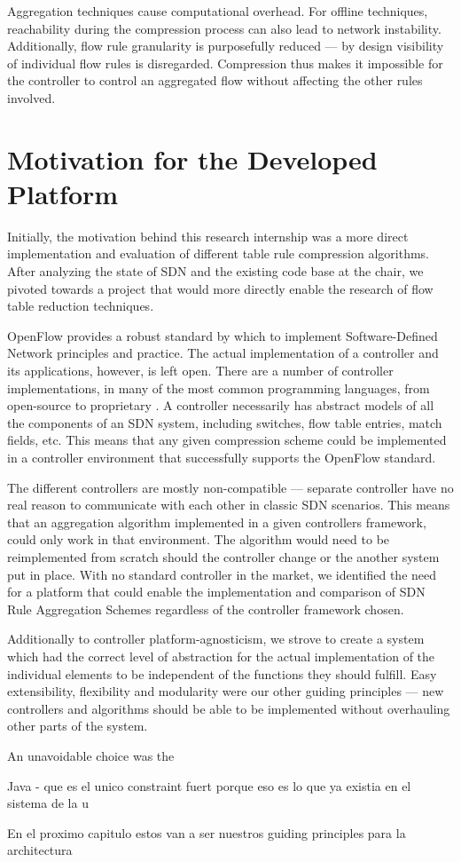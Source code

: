 Aggregation techniques cause computational overhead. For offline techniques, reachability during the compression process can also lead to network instability. Additionally, flow rule granularity is purposefully reduced — by design visibility of individual flow rules is disregarded. Compression thus makes it impossible for the controller to control an aggregated flow without affecting the other rules involved. 

\section{Motivation for the Developed Platform}

Initially, the motivation behind this research internship was a more direct implementation and evaluation of different table rule compression algorithms. After analyzing the state of SDN and the existing code base at the chair, we pivoted towards a project that would more directly enable the research of flow table reduction techniques. 

OpenFlow provides a robust standard by which to implement Software-Defined Network principles and practice. The actual implementation of a controller and its applications, however, is left open. There are a number of controller implementations, in many of the most common programming languages, from open-source to proprietary \cite{Nunes2014}. A controller necessarily has abstract models of all the components of an SDN system, including switches, flow table entries, match fields, etc. This means that any given compression scheme could be implemented in a controller environment that successfully supports the OpenFlow standard.

The different controllers are mostly non-compatible — separate controller have no real reason to communicate with each other in classic SDN scenarios. This means that an aggregation algorithm implemented in a given controllers framework, could only work in that environment. The algorithm would need to be reimplemented from scratch should the controller change or the another system put in place. With no standard controller in the market, we identified the need for a platform that could enable the implementation and comparison of SDN Rule Aggregation Schemes regardless of the controller framework chosen. 

Additionally to controller platform-agnosticism, we strove to create a system which had the correct level of abstraction for the actual implementation of the individual elements to be independent of the functions they should fulfill. Easy extensibility, flexibility and modularity were our other guiding principles — new controllers and algorithms should be able to be implemented without overhauling other parts of the system.

An unavoidable choice was the 

Java - que es el unico constraint fuert porque eso es lo que ya existia en el sistema de la u

En el proximo capitulo estos van a ser nuestros guiding principles para la architectura